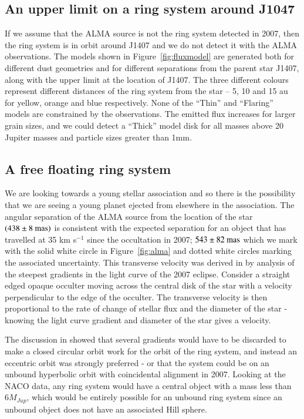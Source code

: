 \documentclass[twocolumn]{aa} %
\newcommand{\kms}{km s$^{-1}$}
\begin{document}
\subsection{An upper limit on a ring system around J1047} %

If we assume that the ALMA source is not the ring system detected in 2007, then the ring system is in orbit around J1407 and we do not detect it with the ALMA observations.
%
The models shown in Figure~\ref{fig:fluxmodel} are generated both for different dust geometries and for different separations from the parent star J1407, along with the upper limit at the location of J1407.
%
The three different colours represent different distances of the ring system from the star --  5, 10 and 15 au for yellow, orange and blue respectively.
%
None of the ``Thin'' and ``Flaring'' models are constrained by the observations.
%
The emitted flux increases for larger grain sizes, and we could detect a ``Thick'' model disk for all masses above 20 Jupiter masses and particle sizes greater than 1mm.

\subsection{A free floating ring system} %

We are looking towards a young stellar association and so there is the possibility that we are seeing a young planet ejected from elsewhere in the association.
%
The angular separation of the ALMA source from the location of the star $(438\pm8\rm{~mas})$ is consistent with the expected separation for an object that has travelled at 35 \kms{} since the occultation in 2007;  $543\pm82\rm{~mas}$ which we mark with the solid white circle in Figure~\ref{fig:alma} and dotted white circles marking the associated uncertainty.
%
This transverse velocity was derived in \citet{Kenworthy15} by analysis of the steepest gradients in the light curve of the 2007 eclipse.
%
Consider a straight edged opaque occulter moving across the central disk of the star with a velocity perpendicular to the edge of the occulter.
%
The transverse velocity is then proportional to the rate of change of stellar flux and the diameter of the star - knowing the light curve gradient and diameter of the star gives a velocity.

The discussion in \citet{Kenworthy15} showed that several gradients would have to be discarded to make a closed circular orbit work for the orbit of the ring system, and instead an eccentric orbit was strongly preferred - or that the system could be on an unbound hyperbolic orbit with coincidental alignment in 2007.
%
Looking at the NACO data, any ring system would have a central object with a mass less than $6M_{Jup}$, which would be entirely possible for an unbound ring system since an unbound object does not have an associated Hill sphere.
\end{document}
